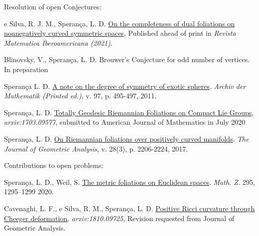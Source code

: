 \documentclass[10pt]{article}
\newenvironment{innerlist}[1][\enskip\textbullet]%
{\begin{compactitem}[#1]}{\end{compactitem}}
\begin{document}
		
		\begin{enumerate}
			
			
  \item 		Resolution of open Conjectures:
		\begin{innerlist}[-]
		\item  e Silva, R. J. M., Sperança, L. D. \href{https://ems.press/journals/rmi/articles/1567309}{On the completeness of dual foliations on nonnegatively curved symmetric spaces}, Published ahead of print in \textit{Revista Matematica Iberoamericana (2021)}.


		\item Blinovsky, V., Sperança, L. D.
		Brouwer's Conjecture for odd number of vertices. In preparation


		
		\item Sperança L. D. \href{https://link.springer.com/article/10.1007/s00013-011-0317-3}{A note on the degree of symmetry of exotic spheres}. {\textit{Archiv der Mathematik (Printed ed.)},  v. 97, p. 495-497, 2011}.
		
		
		
		
		\item Sperança, L. D. \href{https://arxiv.org/abs/1703.09577}{Totally Geodesic Riemannian Foliations on Compact Lie Groups}, \textit{{arxiv:1703.09577}}, submitted to  American Journal of Mathematics in July 2020
		
		
		\item Sperança, L. D. \href{https://link.springer.com/article/10.1007/s12220-017-9901-5}{On Riemannian foliations over positively curved manifolds}. {\textit{The Journal of Geometric Analysis}, v. 28(3), p. 2206-2224, 2017}.
		
		\end{innerlist}
		
		
		\item Contributions to open problems:
		\begin{innerlist}[-]
			
		
		\item Sperança, L. D., Weil, S.  \href{https://link.springer.com/article/10.1007/s00209-019-02425-3}{The metric foliations on Euclidean spaces}. \textit{Math. Z.} 295, 1295–1299 2020.
		
		
		\item Cavenaghi, L. F., e Silva, R. M., Sperança, L. D. \href{https://arxiv.org/abs/1810.09725}{Positive Ricci curvature through Cheeger deformation},
		\textit{{arxiv:1810.09725}}, Revision requested from  Journal of Geometric Analysis.
		

\end{innerlist}
\end{enumerate}
\end{document}
